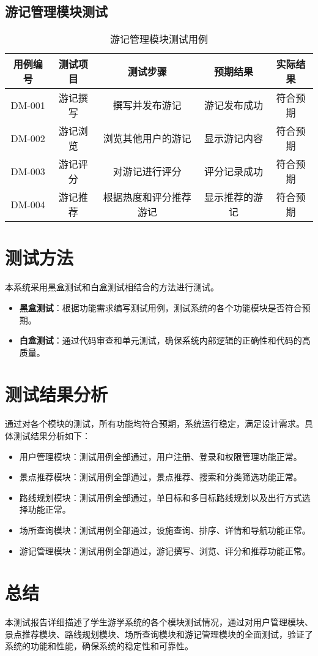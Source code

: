 \documentclass{ctexart}
\begin{document}
\subsection{游记管理模块测试}
\begin{table}[H]
    \centering
    \caption{游记管理模块测试用例}
    \begin{tabular}{|c|c|c|c|c|}
        \hline
        \textbf{用例编号} & \textbf{测试项目} & \textbf{测试步骤} & \textbf{预期结果} & \textbf{实际结果} \\
        \hline
        DM-001        & 游记撰写          & 撰写并发布游记       & 游记发布成功        & 符合预期          \\
        \hline
        DM-002        & 游记浏览          & 浏览其他用户的游记     & 显示游记内容        & 符合预期          \\
        \hline
        DM-003        & 游记评分          & 对游记进行评分       & 评分记录成功        & 符合预期          \\
        \hline
        DM-004        & 游记推荐          & 根据热度和评分推荐游记   & 显示推荐的游记       & 符合预期          \\
        \hline
    \end{tabular}
\end{table}

\section{测试方法}
本系统采用黑盒测试和白盒测试相结合的方法进行测试。
\begin{itemize}
    \item \textbf{黑盒测试}：根据功能需求编写测试用例，测试系统的各个功能模块是否符合预期。
    \item \textbf{白盒测试}：通过代码审查和单元测试，确保系统内部逻辑的正确性和代码的高质量。
\end{itemize}

\section{测试结果分析}
通过对各个模块的测试，所有功能均符合预期，系统运行稳定，满足设计需求。具体测试结果分析如下：
\begin{itemize}
    \item 用户管理模块：测试用例全部通过，用户注册、登录和权限管理功能正常。
    \item 景点推荐模块：测试用例全部通过，景点推荐、搜索和分类筛选功能正常。
    \item 路线规划模块：测试用例全部通过，单目标和多目标路线规划以及出行方式选择功能正常。
    \item 场所查询模块：测试用例全部通过，设施查询、排序、详情和导航功能正常。
    \item 游记管理模块：测试用例全部通过，游记撰写、浏览、评分和推荐功能正常。
\end{itemize}

\section{总结}
本测试报告详细描述了学生游学系统的各个模块测试情况，通过对用户管理模块、景点推荐模块、路线规划模块、场所查询模块和游记管理模块的全面测试，验证了系统的功能和性能，确保系统的稳定性和可靠性。
\end{document}
